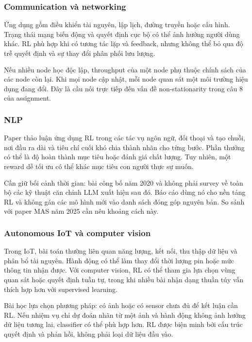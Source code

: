 \subsubsection{Communication và
networking}\label{communication-vuxe0-networking}

Ứng dụng gồm điều khiển tài nguyên, lập lịch, đường truyền hoặc cấu
hình. Trạng thái mạng biến động và quyết định cục bộ có thể ảnh hưởng
người dùng khác. RL phù hợp khi có tương tác lặp và feedback, nhưng
không thể bỏ qua độ trễ quyết định và sự thay đổi phân phối lưu lượng.

Nếu nhiều node học độc lập, throughput của một node phụ thuộc chính sách
của các node còn lại. Khi mọi node cập nhật, mỗi node quan sát một môi
trường hiệu dụng đang đổi. Đây là cầu nối trực tiếp đến vấn đề
non-stationarity trong câu 8 của assignment.

\subsubsection{NLP}\label{nlp}

Paper thảo luận ứng dụng RL trong các tác vụ ngôn ngữ, đối thoại và tạo
chuỗi, nơi đầu ra dài và tiêu chí cuối khó chia thành nhãn cho từng
bước. Phần thưởng có thể là độ hoàn thành mục tiêu hoặc đánh giá chất
lượng. Tuy nhiên, một reward dễ tối ưu có thể khác mục tiêu con người
thực sự muốn.

Cần giữ bối cảnh thời gian: bài công bố năm 2020 và không phải survey về
toàn bộ các kỹ thuật căn chỉnh LLM xuất hiện sau đó. Báo cáo dùng nó cho
nền tảng RL và không gán các mô hình mới vào danh sách đóng góp nguyên
bản. So sánh với paper MAS năm 2025 cần nêu khoảng cách này.

\subsubsection{Autonomous IoT và computer
vision}\label{autonomous-iot-vuxe0-computer-vision}

Trong IoT, bài toán thường liên quan năng lượng, kết nối, thu thập dữ
liệu và phân bổ tài nguyên. Hành động có thể làm thay đổi thời lượng pin
hoặc mức thông tin nhận được. Với computer vision, RL có thể tham gia
lựa chọn vùng quan sát hoặc quyết định tuần tự, trong khi nhiều bài nhận
dạng thuần túy vẫn thích hợp hơn với supervised learning.

Bài học lựa chọn phương pháp: có ảnh hoặc có sensor chưa đủ để kết luận
cần RL. Nếu nhiệm vụ chỉ dự đoán nhãn từ một ảnh và hành động không ảnh
hưởng dữ liệu tương lai, classifier có thể phù hợp hơn. RL được biện
minh bởi cấu trúc quyết định và phản hồi, không phải loại dữ liệu đầu
vào.

